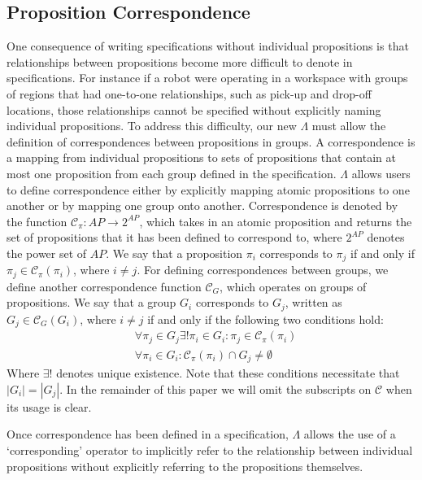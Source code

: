 \subsection{Proposition Correspondence} 
One consequence of writing specifications without individual propositions is that relationships between propositions become more difficult to denote in specifications. 
For instance if a robot were operating in a workspace with groups of regions that had one-to-one relationships, such as pick-up and drop-off locations, those relationships cannot be specified without explicitly naming individual propositions. 
To address this difficulty, our new $\Lambda$ must allow the definition of correspondences between propositions in groups. 
A correspondence is a mapping from individual propositions to sets of propositions that contain at most one proposition from each group defined in the specification. 
$\Lambda$ allows users to define correspondence either by explicitly mapping atomic propositions to one another or by mapping one group onto another. 
Correspondence is denoted by the function $\mathcal{C}_\pi: AP \rightarrow 2^{AP}$, which takes in an atomic proposition and returns the set of propositions that it has been defined to correspond to, where $2^{AP}$ denotes the power set of $AP$. We say that a proposition $\pi_i$ corresponds to $\pi_j$ if and only if $\pi_j \in \mathcal{C}_\pi(\pi_i)$, where $i \neq j$. 
For defining correspondences between groups, we define another correspondence function $\mathcal{C}_G$, which operates on groups of propositions. 
We say that a group $G_i$ corresponds to $G_j$, written as $G_j \in \mathcal{C}_G(G_i)$, where $i \neq j$ if and only if the following two conditions hold:
\begin{subequations}
\begin{align}
	&\forall \pi_j \in G_j \exists! \pi_i \in G_i : \pi_j \in \mathcal{C}_\pi(\pi_i) \\
	&\forall \pi_i \in G_i : \mathcal{C}_\pi(\pi_i) \cap G_j \neq \emptyset
\end{align}
\end{subequations}
Where $\exists!$ denotes unique existence. 
Note that these conditions necessitate that $|G_i| = |G_j|$.
In the remainder of this paper we will omit the subscripts on $\mathcal{C}$ when its usage is clear. 
\par Once correspondence has been defined in a specification, $\Lambda$ allows the use of a `corresponding' operator to implicitly refer to the relationship between individual propositions without explicitly referring to the propositions themselves. 
